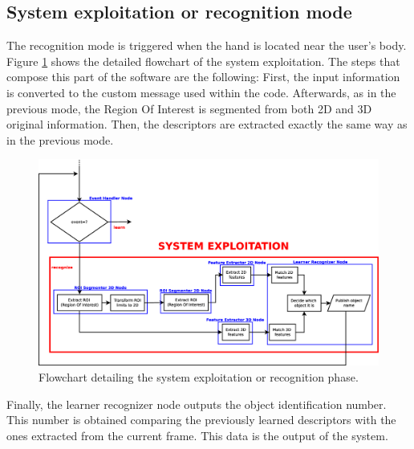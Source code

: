\subsection{System exploitation or recognition mode}


The recognition mode is triggered when the hand is located near the user's body. 
Figure \ref{flowchart3} shows the detailed flowchart of the system exploitation. 
The steps that compose this part of the software are the following:
First, the input information is converted to the custom message used within the code. Afterwards, as in the previous mode, the Region Of Interest is segmented from both 2D and 3D original information. Then, the descriptors are extracted exactly the same way as in the previous mode. 
\\

\begin{figure}[H]
	\begin{center}
\includegraphics[width=\linewidth]{img/diagrams/flowchart3.eps}
	\caption[System exploitation flowchart]{Flowchart detailing the system exploitation or recognition phase.}
		\label{flowchart3}

	\end{center}
\end{figure}



Finally, the learner recognizer node outputs the object identification number. 
This number is obtained comparing the previously learned descriptors with the ones extracted from the current frame. 
This data is the output of the system. 

